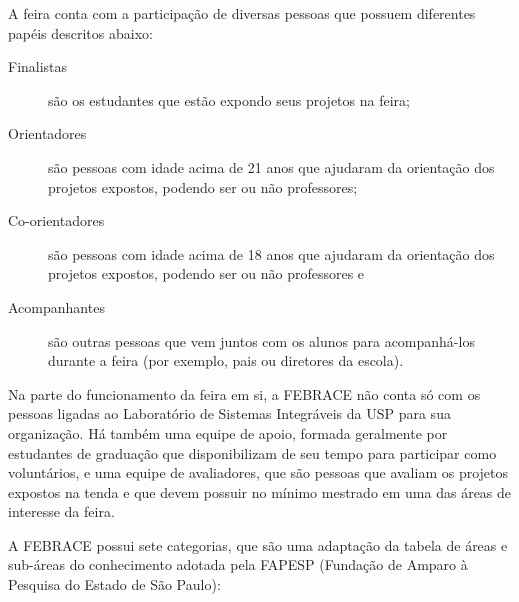 A feira conta com a participação de diversas pessoas que possuem diferentes papéis descritos abaixo:

\begin{description}
    \item[Finalistas] 
        são os estudantes que estão expondo seus projetos na feira;
    \item[Orientadores] 
        são pessoas com idade acima de 21 anos que ajudaram da orientação dos projetos expostos, podendo ser ou não professores;
    \item[Co-orientadores] 
        são pessoas com idade acima de 18 anos que ajudaram da orientação dos projetos expostos, podendo ser ou não professores e
    \item[Acompanhantes] 
        são outras pessoas que vem juntos com os alunos para acompanhá-los durante a feira (por exemplo, pais ou diretores da escola).
\end{description}

Na parte do funcionamento da feira em si, a FEBRACE não conta só com os pessoas ligadas ao Laboratório de Sistemas Integráveis da USP para sua organização. Há também uma equipe de apoio, formada geralmente por estudantes de graduação que disponibilizam de seu tempo para participar como voluntários, e uma equipe de avaliadores, que são pessoas que avaliam os projetos expostos na tenda e que devem possuir no mínimo mestrado em uma das áreas de interesse da feira.

A FEBRACE possui sete categorias, que são uma adaptação da tabela de áreas e sub-áreas do conhecimento adotada pela FAPESP (Fundação de Amparo à Pesquisa do Estado de São Paulo):

